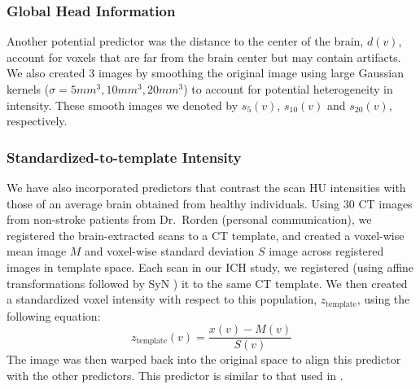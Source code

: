 \documentclass{elsarticle_nonatbib}\usepackage[]{graphicx}\usepackage[]{color}
\begin{document}
\subsubsection{Global Head Information} Another potential predictor was the distance to the center of the brain, $d(v)$, account for voxels that are far from the brain center but may contain artifacts.  We also created $3$ images by smoothing the original image using large Gaussian kernels ($\sigma = 5mm^3, 10mm^3, 20mm^3$) to account for potential heterogeneity in intensity. These smooth images we denoted by $s_{5}(v)$, $s_{10}(v)$ and $s_{20}(v)$, respectively.   

\subsubsection{Standardized-to-template Intensity}  
We have also incorporated predictors that contrast the scan HU intensities with those of an average brain obtained from healthy individuals.  Using $30$ CT images from non-stroke patients from Dr.~Rorden (personal communication), we registered the brain-extracted scans to a CT template, and created a voxel-wise mean image $M$ and voxel-wise standard deviation $S$ image across registered images in template space.  Each scan in our ICH study, we registered (using affine transformations followed by SyN \citep{avants_symmetric_2008}) it to the same CT template. We then  created a standardized voxel intensity with respect to this population, $z_{\text{template}}$, using the following equation:
$$
z_{\text{template}}(v) = \frac{x(v) - M(v)}{S(v)}
$$
The image was then warped back into the original space to align this predictor with the other predictors.  This predictor is similar to that used in \citet{gillebert_automated_2014}.  


\end{document}
